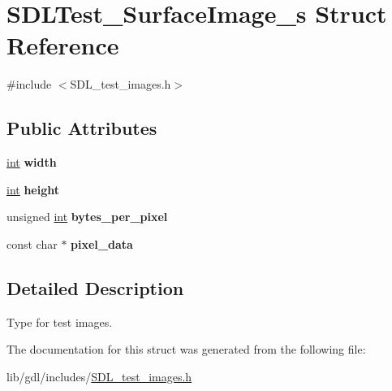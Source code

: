 \hypertarget{struct_s_d_l_test___surface_image__s}{}\section{S\+D\+L\+Test\+\_\+\+Surface\+Image\+\_\+s Struct Reference}
\label{struct_s_d_l_test___surface_image__s}


{\ttfamily \#include $<$S\+D\+L\+\_\+test\+\_\+images.\+h$>$}

\subsection*{Public Attributes}
\begin{DoxyCompactItemize}
\item 
\hypertarget{struct_s_d_l_test___surface_image__s_a3cbacf6b015a22832ab4d3f509719609}{}\hyperlink{_s_d_l__thread_8h_a6a64f9be4433e4de6e2f2f548cf3c08e}{int} {\bfseries width}\label{struct_s_d_l_test___surface_image__s_a3cbacf6b015a22832ab4d3f509719609}

\item 
\hypertarget{struct_s_d_l_test___surface_image__s_a310092874695556e4b7f1f63aec24213}{}\hyperlink{_s_d_l__thread_8h_a6a64f9be4433e4de6e2f2f548cf3c08e}{int} {\bfseries height}\label{struct_s_d_l_test___surface_image__s_a310092874695556e4b7f1f63aec24213}

\item 
\hypertarget{struct_s_d_l_test___surface_image__s_a2daf91bab3d79fb9dfa25e8ade43e606}{}unsigned \hyperlink{_s_d_l__thread_8h_a6a64f9be4433e4de6e2f2f548cf3c08e}{int} {\bfseries bytes\+\_\+per\+\_\+pixel}\label{struct_s_d_l_test___surface_image__s_a2daf91bab3d79fb9dfa25e8ade43e606}

\item 
\hypertarget{struct_s_d_l_test___surface_image__s_acf2d3006bea5690f564d3003d1512fa7}{}const char $\ast$ {\bfseries pixel\+\_\+data}\label{struct_s_d_l_test___surface_image__s_acf2d3006bea5690f564d3003d1512fa7}

\end{DoxyCompactItemize}


\subsection{Detailed Description}
Type for test images. 

The documentation for this struct was generated from the following file\+:\begin{DoxyCompactItemize}
\item 
lib/gdl/includes/\hyperlink{_s_d_l__test__images_8h}{S\+D\+L\+\_\+test\+\_\+images.\+h}\end{DoxyCompactItemize}
